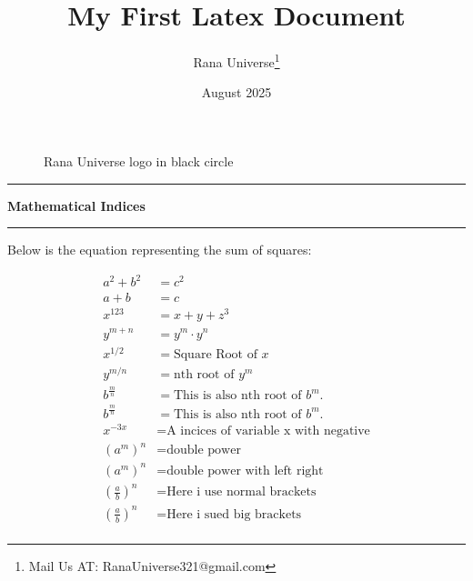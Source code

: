\documentclass[12pt, letterpaper]{article}
\title{My First Latex Document}
\author{Rana Universe\thanks{Mail Us AT: RanaUniverse321@gmail.com}}
\date{August 2025}
\begin{document}
\maketitle






\begin{figure}[htbp]
\centering


\caption{Rana Universe logo in black circle}

\label{fig:rana-universe-logo}

\end{figure}


\newpage

\noindent\rule{\linewidth}{5pt}

\begin{center}
    \Huge\textbf{Mathematical Indices}
\end{center}

\noindent\rule{\linewidth}{5pt}


Below is the equation representing the sum of squares:

\[
\begin{aligned}
a^2 + b^2 &= c^2 \\
a + b &= c\\
x^{123} &= x + y + z ^ 3\\
y^{m+n} &= y^m \cdot y^n\\
x^{1/2} &= \text{Square Root of } x \\
y^{m/n} &= \text{nth root of } y^m \\
b^{\frac{m}{n}} &= \text{This is also nth root of } b^m. \\
b^{\frac{m}{n}} &= \text{This is also nth root of } b^m \text{.} \\
x^{-3x} &= \text{A incices of variable x with negative} \\
(a^m)^n & = \text{double power}\\
\left(a^m\right)^n &= \text{double power with left right} \\
(\frac{a}{b})^n &= \text{Here i use normal brackets}\\
\left( \frac{a}{b} \right)^n &=\text{Here i sued big brackets} \\
\end{aligned}
\]
\end{document}
